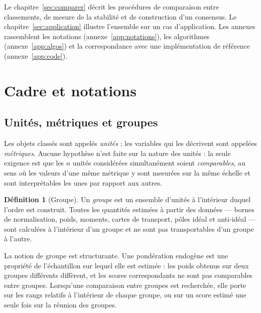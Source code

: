 \documentclass[11pt,a4paper]{article}
\theoremstyle{definition}
\newtheorem{definition}{Définition}[section]
\theoremstyle{remark}
\begin{document}
\medskip

Le chapitre~\ref{sec:comparer} décrit les procédures de comparaison entre classements, de
mesure de la stabilité et de construction d'un consensus. Le
chapitre~\ref{sec:application} illustre l'ensemble sur un cas d'application. Les annexes
rassemblent les notations (annexe~\ref{app:notations}), les algorithmes
(annexe~\ref{app:algos}) et la correspondance avec une implémentation de référence
(annexe~\ref{app:code}).

\section{Cadre et notations}
\label{sec:cadre}

\medskip

\subsection{Unités, métriques et groupes}

\medskip

Les objets classés sont appelés \emph{unités} ; les variables qui les décrivent sont
appelées \emph{métriques}. Aucune hypothèse n'est faite sur la nature des unités : la
seule exigence est que les $n$ unités considérées simultanément soient
\emph{comparables}, au sens où les valeurs d'une même métrique y sont mesurées sur la même
échelle et sont interprétables les unes par rapport aux autres.

\medskip

\begin{definition}[Groupe]
  \label{def:groupe}
  Un \emph{groupe} est un ensemble d'unités à l'intérieur duquel l'ordre est construit.
  Toutes les quantités estimées à partir des données --- bornes de normalisation, poids,
  moments, cartes de transport, pôles idéal et anti-idéal --- sont calculées à
  l'intérieur d'un groupe et ne sont pas transportables d'un groupe à l'autre.
\end{definition}

\bigskip

La notion de groupe est structurante. Une pondération endogène est une propriété de
l'échantillon sur lequel elle est estimée : les poids obtenus sur deux groupes différents
diffèrent, et les scores correspondants ne sont pas comparables entre groupes. Lorsqu'une
comparaison entre groupes est recherchée, elle porte sur les rangs relatifs à l'intérieur
de chaque groupe, ou sur un score estimé une seule fois sur la réunion des groupes.
\end{document}
